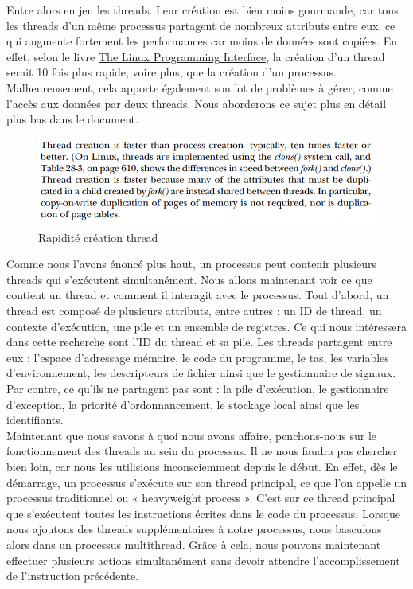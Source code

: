 Entre alors en jeu les threads. Leur création est bien moins gourmande, car tous les threads d’un même processus partagent de nombreux attributs entre eux, ce qui augmente fortement les performances car moins de données sont copiées. En effet, selon le livre \href{file:///C:/Users/rochk/Downloads/The%20Linux%20Programming%20Interface-Michael%20Kerrisk.pdf}{The Linux Programming Interface}, la création d'un thread serait 10 fois plus rapide, voire plus, que la création d'un processus. Malheureusement, cela apporte également son lot de problèmes à gérer, comme l’accès aux données par deux threads. Nous aborderons ce sujet plus en détail plus bas dans le document.
\\
\begin{figure}[ht]
    \centering
    \includegraphics[width=0.9\linewidth]{thread_creation.png}
    \caption{Rapidité création thread}
    \label{fig:thread_creation}
\end{figure}
\vspace{\baselineskip}

Comme nous l’avons énoncé plus haut, un processus peut contenir plusieurs threads qui s’exécutent simultanément. Nous allons maintenant voir ce que contient un thread et comment il interagit avec le processus. Tout d’abord, un thread est composé de plusieurs attributs, entre autres : un ID de thread, un contexte d'exécution, une pile et un ensemble de registres.
Ce qui nous intéressera dans cette recherche sont l'ID du thread et sa pile. Les threads partagent entre eux : l’espace d’adressage mémoire, le code du programme, le tas, les variables d’environnement, les descripteurs de fichier ainsi que le gestionnaire de signaux. Par contre, ce qu’ils ne partagent pas sont : la pile d’exécution, le gestionnaire d’exception, la priorité d’ordonnancement, le stockage local ainsi que les identifiants.
\\

Maintenant que nous savons à quoi nous avons affaire, penchons-nous sur le fonctionnement des threads au sein du processus. Il ne nous faudra pas chercher bien loin, car nous les utilisions inconsciemment depuis le début. En effet, dès le démarrage, un processus s’exécute sur son thread principal, ce que l’on appelle un processus traditionnel ou « heavyweight process ». C’est sur ce thread principal que s’exécutent toutes les instructions écrites dans le code du processus. Lorsque nous ajoutons des threads supplémentaires à notre processus, nous basculons alors dans un processus multithread. Grâce à cela, nous pouvons maintenant effectuer plusieurs actions simultanément sans devoir attendre l’accomplissement de l’instruction précédente.
\\

